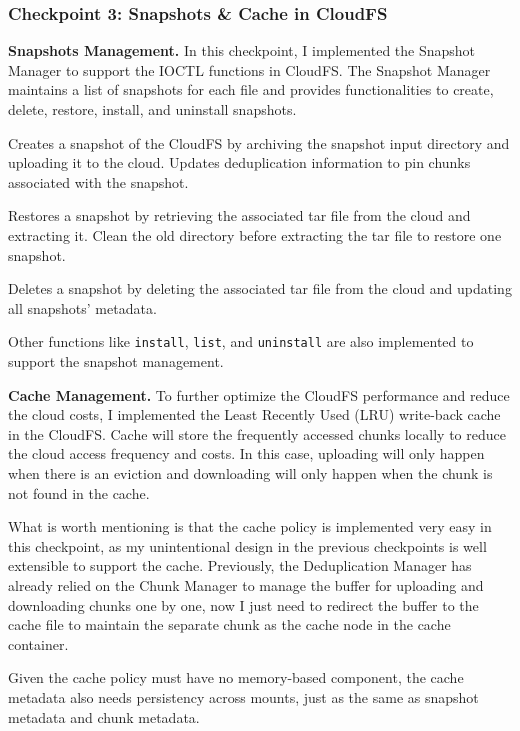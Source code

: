 \documentclass[10pt]{article}
\begin{document}
\vspace{0.5cm}
\subsubsection*{Checkpoint 3: Snapshots \& Cache in CloudFS}

\textbf{Snapshots Management.}
In this checkpoint, I implemented the Snapshot Manager to support the IOCTL functions in CloudFS.
The Snapshot Manager maintains a list of snapshots for each file and provides functionalities to create, delete, restore, install, and uninstall snapshots.

Creates a snapshot of the CloudFS by archiving the snapshot input directory and
uploading it to the cloud. Updates deduplication information to pin chunks associated
with the snapshot.

Restores a snapshot by retrieving the associated tar file from the cloud and
extracting it. Clean the old directory before extracting the tar file to restore one
snapshot.

Deletes a snapshot by deleting the associated tar file from the cloud and updating all snapshots' metadata.

Other functions like \texttt{install}, \texttt{list}, and \texttt{uninstall} are also implemented to support the snapshot management.

\vspace{0.5cm}
\textbf{Cache Management.}
To further optimize the CloudFS performance and reduce the cloud costs,
I implemented the Least Recently Used (LRU) write-back cache in the CloudFS.
Cache will store the frequently accessed chunks locally to reduce the cloud access frequency and costs. In this case, uploading will only happen when there is an eviction and downloading will only happen when the chunk is not found in the cache.

What is worth mentioning is that the cache policy is implemented very easy in this checkpoint,
as my unintentional design in the previous checkpoints is well extensible to support the cache.
Previously, the Deduplication Manager has already relied on the Chunk Manager to manage the buffer for uploading and downloading chunks one by one,
now I just need to redirect the buffer to the cache file to maintain the separate chunk as the cache node in the cache container.

Given the cache policy must have no memory-based component,
the cache metadata also needs persistency across mounts, just as the same as snapshot metadata and chunk metadata.
\end{document}
